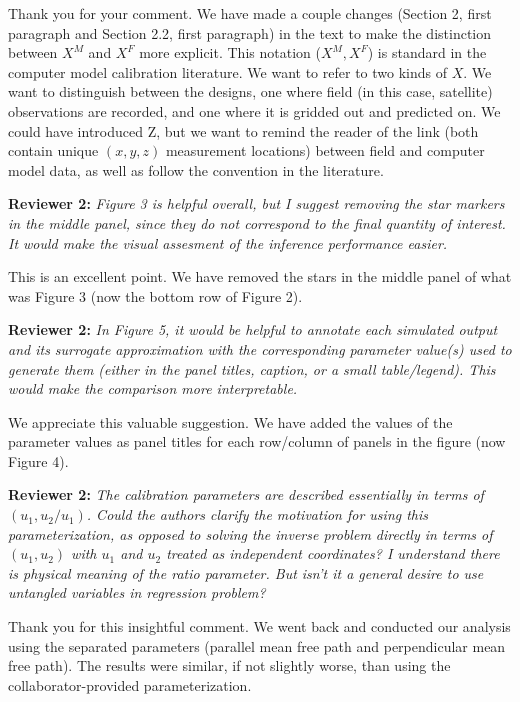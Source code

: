 \documentclass[12pt]{article}
\begin{document}
\bigskip
\noindent
Thank you for your comment. We have made a couple changes (Section 2, first
paragraph and Section 2.2, first paragraph) in the text to make the
distinction between $X^M$ and $X^F$ more explicit. This notation ($X^M, X^F$)
is standard in the computer model calibration literature. We want to refer to
two kinds of $X$. We want to distinguish between the designs, one where
field (in this case, satellite) observations are recorded, and one where it is
gridded out and predicted on. We could have introduced Z, but we want to
remind the reader of the link (both contain unique $(x, y, z)$ measurement
locations) between field and computer model data, as well as follow the
convention in the literature.

\bigskip
\noindent
\textbf{Reviewer 2:} \textit{Figure 3 is helpful overall, but I suggest
removing the star markers in the middle panel, since they do not correspond to
the final quantity of interest. It would make the visual assesment of the
inference performance easier.}

\bigskip
\noindent
This is an excellent point. We have removed the stars in the middle panel of
what was Figure 3 (now the bottom row of Figure 2).

\bigskip
\noindent
\textbf{Reviewer 2:} \textit{In Figure 5, it would be helpful to annotate each
simulated output and its surrogate approximation with the corresponding
parameter value(s) used to generate them (either in the panel titles, caption,
or a small table/legend). This would make the comparison more interpretable.}

\bigskip
\noindent
We appreciate this valuable suggestion. We have added the values of the
parameter values as panel titles for each row/column of panels in the figure
(now Figure 4).

\bigskip
\noindent
\textbf{Reviewer 2:} \textit{The calibration parameters are described
essentially in terms of \((u_1, u_2/u_1)\). Could the authors clarify the
motivation for using this parameterization, as opposed to solving the inverse
problem directly in terms of \((u_1, u_2)\) with \(u_1\) and \(u_2\) treated
as independent coordinates? I understand there is physical meaning of the
ratio parameter. But isn’t it a general desire to use untangled variables in
regression problem?}

\bigskip
\noindent
Thank you for this insightful comment. We went back and conducted our analysis
using the separated parameters (parallel mean free path and perpendicular mean
free path). The results were similar, if not slightly worse, than using the
collaborator-provided parameterization.
\end{document}
